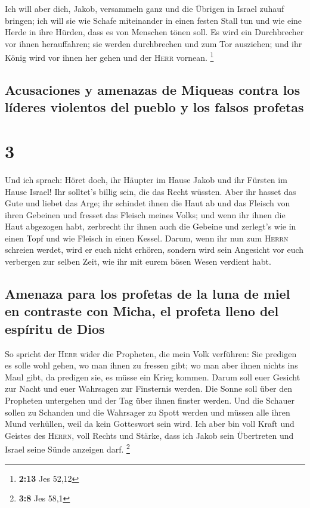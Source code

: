  Ich will aber dich, Jakob, versammeln ganz und die
Übrigen in Israel zuhauf bringen; ich will sie wie Schafe miteinander in
einen festen Stall tun und wie eine Herde in ihre Hürden, dass es von
Menschen tönen soll.  Es wird ein Durchbrecher vor ihnen
herauffahren; sie werden durchbrechen und zum Tor ausziehen; und ihr
König wird vor ihnen her gehen und der \textsc{Herr} vornean.
\footnote{\textbf{2:13} Jes 52,12}

\hypertarget{acusaciones-y-amenazas-de-miqueas-contra-los-luxedderes-violentos-del-pueblo-y-los-falsos-profetas}{%
\subsection{Acusaciones y amenazas de Miqueas contra los líderes
violentos del pueblo y los falsos
profetas}\label{acusaciones-y-amenazas-de-miqueas-contra-los-luxedderes-violentos-del-pueblo-y-los-falsos-profetas}}

\hypertarget{section-2}{%
\section{3}\label{section-2}}

 Und ich sprach: Höret doch, ihr Häupter im Hause Jakob
und ihr Fürsten im Hause Israel! Ihr solltet's billig sein, die das
Recht wüssten.  Aber ihr hasset das Gute und liebet das
Arge; ihr schindet ihnen die Haut ab und das Fleisch von ihren Gebeinen
 und fresset das Fleisch meines Volks; und wenn ihr ihnen
die Haut abgezogen habt, zerbrecht ihr ihnen auch die Gebeine und
zerlegt's wie in einen Topf und wie Fleisch in einen Kessel.
 Darum, wenn ihr nun zum \textsc{Herrn} schreien werdet,
wird er euch nicht erhören, sondern wird sein Angesicht vor euch
verbergen zur selben Zeit, wie ihr mit eurem bösen Wesen verdient habt.

\hypertarget{amenaza-para-los-profetas-de-la-luna-de-miel-en-contraste-con-micha-el-profeta-lleno-del-espuxedritu-de-dios}{%
\subsection{Amenaza para los profetas de la luna de miel en contraste
con Micha, el profeta lleno del espíritu de
Dios}\label{amenaza-para-los-profetas-de-la-luna-de-miel-en-contraste-con-micha-el-profeta-lleno-del-espuxedritu-de-dios}}

 So spricht der \textsc{Herr} wider die Propheten, die
mein Volk verführen: Sie predigen es solle wohl gehen, wo man ihnen zu
fressen gibt; wo man aber ihnen nichts ins Maul gibt, da predigen sie,
es müsse ein Krieg kommen.  Darum soll euer Gesicht zur
Nacht und euer Wahrsagen zur Finsternis werden. Die Sonne soll über den
Propheten untergehen und der Tag über ihnen finster werden.
 Und die Schauer sollen zu Schanden und die Wahrsager zu
Spott werden und müssen alle ihren Mund verhüllen, weil da kein
Gotteswort sein wird.  Ich aber bin voll Kraft und Geistes
des \textsc{Herrn}, voll Rechts und Stärke, dass ich Jakob sein
Übertreten und Israel seine Sünde anzeigen darf. \footnote{\textbf{3:8}
  Jes 58,1}

